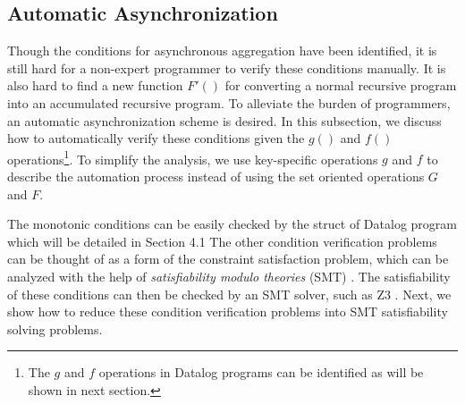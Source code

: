 \begin{comment}
Next, we formally provide the convertibility conditions as follows.

\begin{theorem}
	\label{th:convert}
	(\textbf{Convertibility}) A recursive program can be converted to an accumulated recursive program for asynchronous aggregation, as long as an aggregate operation $G'()$ with the \textbf{accumulative} and \textbf{commutative} properties can be found with the following conditions:\\
	\begin{itemize}
		\item \textbf{convertible}: $G\circ F(X^{k+1})=G'(X^k\cup G'\circ F(\Delta X^k))$
\item \textbf{eliminable}: $\vert\vert lim_{n\rightarrow\infty}(G'\circ F)^n(x)\vert\vert=\textbf{0}$,
	\end{itemize}
	 The $G'()$ operation is the aggregate operation in the new accumulated recursive program.
\end{theorem}

The formal proof can be found in Appendix Sec. \ref{sec:app:proof:convert}. 
Note that, it is not realistic to perform recursion infinite times. In practice, we will stop the recursion as long as the incremental value $(G'\circ F)^n(x)$ is ``small'' enough.

\end{comment}




\subsection{Automatic Asynchronization}
\label{sec:async:autoasync}


Though the conditions for asynchronous aggregation have been identified, it is still hard for a non-expert programmer to verify these conditions manually. It is also hard to find a new function $F'()$ for converting a normal recursive program into an accumulated recursive program.
 To alleviate the burden of programmers, an automatic asynchronization scheme is desired. In this subsection, we discuss how to automatically verify these conditions given the $g()$ and $f()$ operations\footnote{The $g$ and $f$ operations in Datalog programs can be identified as will be shown in next section.}. To simplify the analysis, we use key-specific operations $g$ and $f$ to describe the automation process instead of using the set oriented operations $G$ and $F$.

The monotonic conditions can be easily checked by the struct of Datalog program which will be detailed in Section 4.1 The other condition verification problems can be thought of as a form of the constraint satisfaction problem, which can be analyzed with the help of \emph{satisfiability modulo theories} (SMT) \cite{53e486195688442995f82bfe28c55731}. The satisfiability of these conditions can then be checked by an SMT solver, such as Z3 \cite{DeMoura:2008:ZES:1792734.1792766}. Next, we show how to reduce these condition verification problems into SMT satisfiability solving problems.

